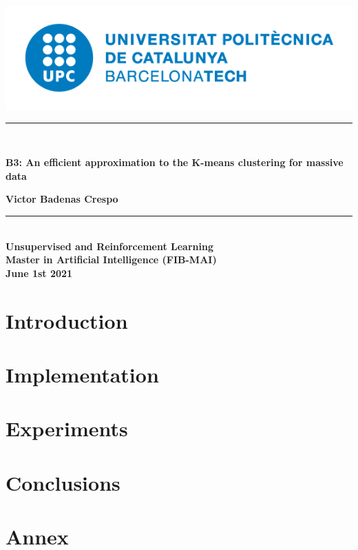 \documentclass[oneside,11pt]{book}
\begin{document}
\titleformat{\chapter}[display]
{\normalfont\huge\bfseries}{\chaptertitlename\ \thechapter}{20pt}{\Huge}
\includegraphics[scale=.3]{upc-logo.png}
\begin{center}
\vspace*{2in}
\noindent\hfil\rule{17cm}{0.2mm}\hfil\\
\begin{Huge}
    \textbf{B3: An efficient approximation to the K-means clustering for massive data\\}
\end{Huge}
\vspace*{0.3in}
\begin{large}
    \textbf{Victor Badenas Crespo}
\end{large}
\noindent\hfil\rule{17cm}{0.2mm}\hfil\\
\vspace*{3in}
\textbf{Unsupervised and Reinforcement Learning\\}
\textbf{Master in Artificial Intelligence (FIB-MAI)\\}
\vspace*{0.2in}
\textbf{June 1st 2021}

\end{center}
\thispagestyle{empty}
\clearpage

\tableofcontents
{}
\clearpage
{}

\chapter{Introduction}


\chapter{Implementation}


\chapter{Experiments}


\chapter{Conclusions}


\chapter{Annex}


\printbibliography
\end{document}
